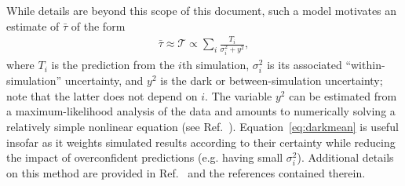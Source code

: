 While details are beyond this scope of this document, such a model motivates an estimate of $\bar \tau$ of the form
\begin{align}
\bar \tau \approx \mathcal T \propto \sum_i \frac{T_i}{\sigma_i^2 + y^2}, \label{eq:darkmean}
\end{align}
where $T_i$ is the prediction from the $i$th simulation, $\sigma_i^2$ is its associated ``within-simulation'' uncertainty, and $y^2$ is the dark or between-simulation uncertainty; note that the latter does not depend on $i$.  The variable $y^2$ can be estimated from a maximum-likelihood analysis of the data and amounts to numerically solving a relatively simple nonlinear equation (see Ref.~\cite{patrone1}).  Equation~\eqref{eq:darkmean} is useful insofar as it weights simulated results according to their certainty while reducing the impact of overconfident predictions (e.g. having small $\sigma_i^2$).  Additional details on this method are provided in Ref.~\cite{patrone1} and the references contained therein.




